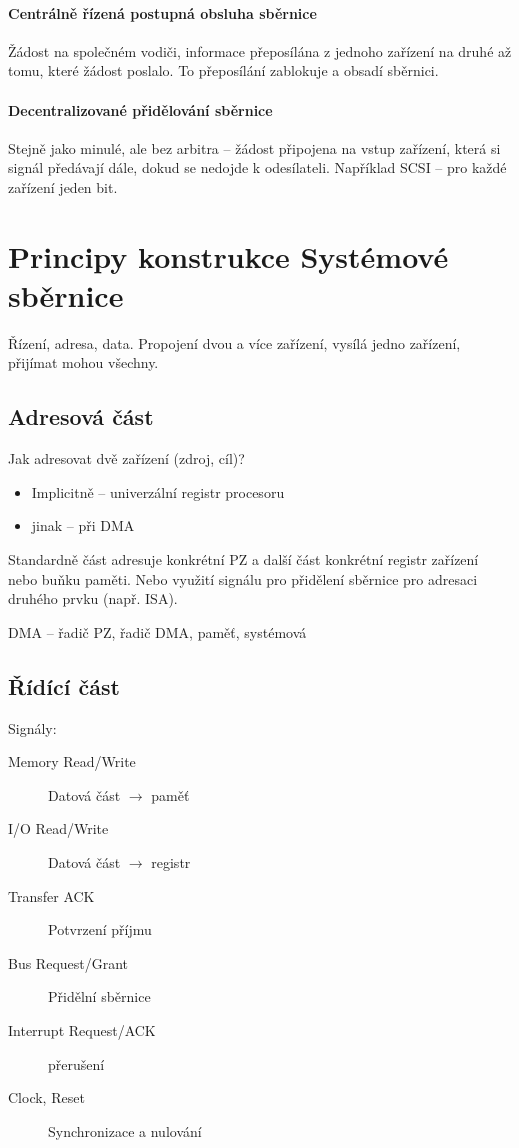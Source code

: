 \documentclass[a4paper, 11pt]{report}
\begin{document}
\paragraph{Centrálně řízená postupná obsluha sběrnice}
Žádost na společném vodiči, informace  přeposílána  z jednoho zařízení na druhé až tomu, které žádost poslalo. To přeposílání zablokuje a obsadí sběrnici.

\paragraph{Decentralizované přidělování sběrnice}
Stejně jako minulé, ale bez arbitra -- žádost připojena na vstup zařízení, která si signál předávají dále, dokud se nedojde k odesílateli. Například SCSI -- pro každé zařízení jeden bit.

\section{Principy konstrukce Systémové sběrnice}

Řízení, adresa, data. Propojení dvou a více zařízení, vysílá jedno zařízení, přijímat mohou všechny. 

\subsection{Adresová část}
Jak adresovat dvě zařízení (zdroj, cíl)?
\begin{itemize}
	\item Implicitně -- univerzální registr procesoru
	\item jinak -- při DMA
\end{itemize}

Standardně část adresuje konkrétní PZ a další část konkrétní registr zařízení nebo buňku paměti. Nebo využití signálu pro přidělení sběrnice pro adresaci druhého prvku (např. ISA).

DMA -- řadič PZ, řadič DMA, paměť, systémová 

\subsection{Řídící část}

Signály:
\begin{description}
	\item[Memory Read/Write] Datová část $\to$ paměť
	\item[I/O Read/Write] Datová část $\to$ registr
	\item[Transfer ACK] Potvrzení příjmu
	\item[Bus Request/Grant] Přidělní sběrnice
	\item[Interrupt Request/ACK] přerušení
	\item[Clock, Reset] Synchronizace a nulování
\end{description}
\end{document}

